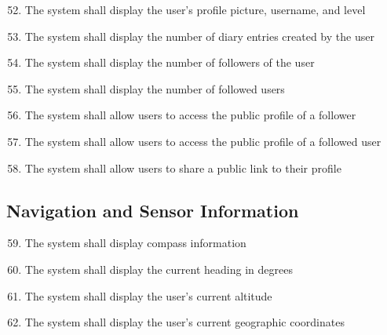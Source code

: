 \begin{enumerate}[label=\textbf{FR\arabic*}, ref=FR\arabic*]

\setcounter{enumi}{51}

\item \label{fr-smartphone:profile-info}
The system shall display the user’s profile picture, username, and level

\item \label{fr-smartphone:diary-count}
The system shall display the number of diary entries created by the user

\item \label{fr-smartphone:follower-count}
The system shall display the number of followers of the user

\item \label{fr-smartphone:following-count}
The system shall display the number of followed users

\item \label{fr-smartphone:access-follower-profile}
The system shall allow users to access the public profile of a follower

\item \label{fr-smartphone:access-following-profile}
The system shall allow users to access the public profile of a followed user

\item \label{fr-smartphone:share-profile}
The system shall allow users to share a public link to their profile

\end{enumerate}







\subsection{Navigation and Sensor Information}

\begin{enumerate}[label=\textbf{FR\arabic*}, ref=FR\arabic*]

\setcounter{enumi}{58}

\item \label{fr-smartphone:compass-info}
The system shall display compass information

\item \label{fr-smartphone:heading-degrees}
The system shall display the current heading in degrees

\item \label{fr-smartphone:altitude}
The system shall display the user’s current altitude

\item \label{fr-smartphone:coordinates}
The system shall display the user’s current geographic coordinates

\end{enumerate}






